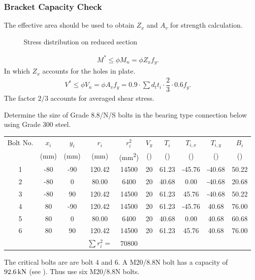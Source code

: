 \subsubsection{Bracket Capacity Check}
The effective area should be used to obtain $Z_x$ and $A_v$ for strength calculation.
\begin{figure}[H]
\centering
\caption{Stress distribution on reduced section}
\end{figure}
\begin{gather}
M^*\leqslant\phi{}M_n=\phi{}Z_xf_y.
\end{gather}
In which $Z_x$ accounts for the holes in plate.
\begin{gather}
V^*\leqslant\phi{}V_n=\phi{}A_vf_y=0.9\cdot\sum{}d_tt_i\cdot\dfrac{2}{3}\cdot0.6f_y.
\end{gather}
The factor $2/3$ accounts for averaged shear stress.
\begin{exmp}
Determine the size of Grade 8.8/N/S bolts in the bearing type connection below using Grade 300 steel.
\begin{figure}[H]

\end{figure}
\end{exmp}
\begin{solution}
\begin{center}
\begin{tabular}{cccccccccc}
	\toprule
	Bolt No. &   $x_i$    &   $y_i$    &     $r_i$      &   $r_i^2$    &   $V_y$    &   $T_i$    & $T_{i,x}$  & $T_{i,y}$  &   $B_i$    \\
	         & (\si{\mm}) & (\si{\mm}) &   (\si{\mm})   & (\si{\mm^2}) & (\si{\kn}) & (\si{\kn}) & (\si{\kn}) & (\si{\kn}) & (\si{\kn}) \\ \midrule
	   1     &    -80     &    -90     &     120.42     &    14500     &     20     &   61.23    &   -45.76   &   -40.68   &   50.22    \\
	   2     &    -80     &     0      &     80.00      &     6400     &     20     &   40.68    &    0.00    &   -40.68   &   20.68    \\
	   3     &    -80     &     90     &     120.42     &    14500     &     20     &   61.23    &   45.76    &   -40.68   &   50.22    \\
	   4     &     80     &    -90     &     120.42     &    14500     &     20     &   61.23    &   -45.76   &   40.68    &   76.00    \\
	   5     &     80     &     0      &     80.00      &     6400     &     20     &   40.68    &    0.00    &   40.68    &   60.68    \\
	   6     &     80     &     90     &     120.42     &    14500     &     20     &   61.23    &   45.76    &   40.68    &   76.00    \\ \bottomrule
	         &            &            & $\sum{}r_i^2=$ &    70800     &            &            &            &            &
\end{tabular}
\end{center}

The critical bolts are are bolt 4 and 6. A M20/8.8N bolt has a capacity of $\SI{92.6}{\kilo\newton}$ (see ). Thus use six M20/8.8N bolts.
\end{solution}
